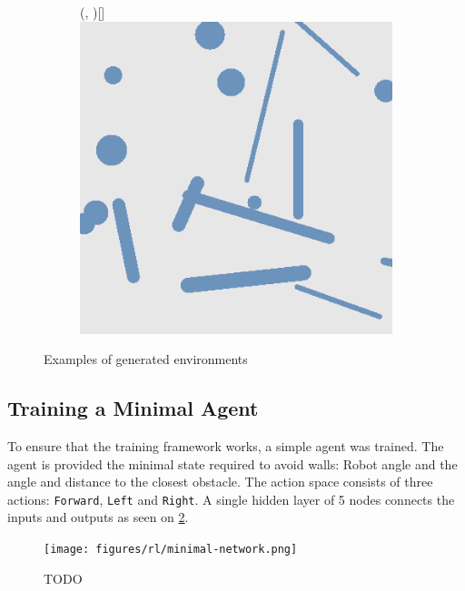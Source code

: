 \begin{figure}[H]
\begin{subfigure}{\w}
{        }
    \end{subfigure}
    \hspace*{\fill}
    \begin{subfigure}{\w}
        \makebox(\textwidth, \textwidth)[\textwidth]{
            \includegraphics[width=\linewidth]{figures/generated-worlds/world_5.png}
        }
    \end{subfigure}
    \caption{Examples of generated environments}
    \label{fig:generated-enviornments}
\end{figure}

\subsection{Training a Minimal Agent}
To ensure that the training framework works, a simple agent was trained. The agent is provided the minimal state required to avoid walls: Robot angle and the angle and distance to the closest obstacle. The action space consists of three actions: \texttt{Forward}, \texttt{Left} and \texttt{Right}. A single hidden layer of {\color{red}5} nodes connects the inputs and outputs as seen on \cref{fig:rl-minimal-net}.

\begin{figure}[H]
    \centering
    \texttt{[image: figures/rl/minimal-network.png]}
    \caption{TODO}
    \label{fig:rl-minimal-net}
\end{figure}


